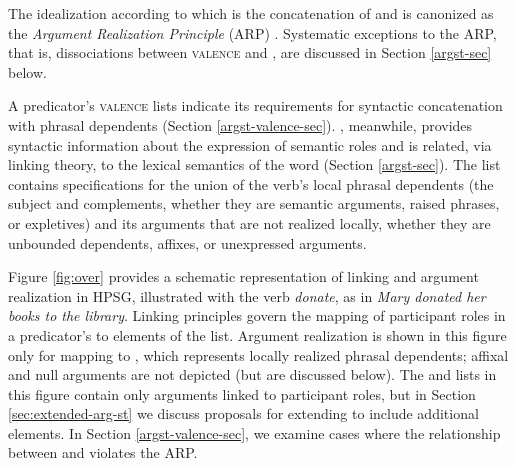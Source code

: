 \documentclass[output=paper
	        ,collection
	        ,collectionchapter
 	        ,biblatex
                ,babelshorthands
                ,newtxmath
                ,draftmode
                ,colorlinks, citecolor=brown
]{langscibook}
\begin{document}
\noindent
The idealization according to which \argst is the concatenation of \subj and \comps is canonized as the \emph{Argument Realization Principle} (ARP)  \citep[494]{SWB2003a}.  Systematic exceptions to the ARP, that is, dissociations between \textsc{valence} and \argst, are discussed in Section \ref{argst-sec} below.  

A predicator's \textsc{valence} lists indicate its requirements for syntactic concatenation with phrasal dependents (Section \ref{argst-valence-sec}). 
\argst, meanwhile, provides syntactic information about the expression of semantic roles and is related, via linking theory, to the lexical semantics of the word (Section \ref{argst-sec}).  
The \argst list contains specifications for the union of the verb's local phrasal dependents (the subject and complements, whether they are semantic arguments, raised phrases, or expletives) and its arguments that are not realized locally, whether they are unbounded dependents, affixes, or unexpressed arguments. 

Figure \ref{fig:over} provides a schematic representation of %
linking and argument realization in HPSG,  illustrated with the verb \textit{donate}, as in \textit{Mary donated her books to the library}.   Linking principles govern the mapping of participant roles in a predicator's \content to %
elements of the \argst list.   Argument realization is shown in this figure only for mapping to \val, which represents locally realized phrasal dependents; affixal and null arguments are not depicted (but are discussed below).
The \argst and \val lists in this figure contain only arguments linked to participant roles,   but in Section \ref{sec:extended-arg-st} we discuss proposals for extending \argst to include additional elements.
In Section \ref{argst-valence-sec}, we examine cases where the relationship between \argst and \val
violates the ARP.
\end{document}

